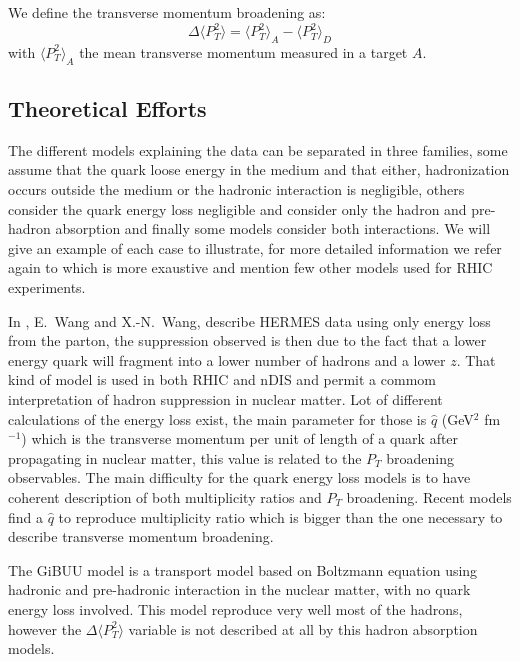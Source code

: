 We define the transverse momentum broadening as:
\begin{equation}
\Delta \langle P_T^2 \rangle = \langle P_T^2 \rangle_A - \langle P_T^2 \rangle_D
\end{equation}
with $\langle P_T^2 \rangle_A$ the mean transverse momentum measured in a target $A$.


\subsection{Theoretical Efforts}
\label{sec:theo}

The different models explaining the data can be separated in three families,
some assume that the quark loose energy in the medium and that either, hadronization occurs
outside the medium or the hadronic interaction is 
negligible, others consider the quark energy loss negligible and consider
only the hadron and pre-hadron absorption and finally some models consider both
interactions. We will give an example of each case to illustrate, for more
detailed information we refer again to \cite{Accardi:2009qv} which is more exaustive and
mention few other models used for RHIC experiments.

In \cite{Wang:2002ri}, E.~Wang and X.-N.~Wang, describe HERMES data using only energy 
loss from the parton, the suppression observed is then due to the fact that a 
lower energy quark will fragment into a lower number of hadrons and a lower 
$z$. That kind of model is used in both RHIC and nDIS and permit a commom 
interpretation of hadron suppression in nuclear matter. Lot of different
calculations of the energy loss exist, the main parameter for those is $\hat q$
(GeV$^2$ fm$^{-1}$) which is the transverse momentum per unit of length of a 
quark after propagating
in nuclear matter, this value is related to the $P_T$ 
broadening observables. The main difficulty for the quark energy loss
models is to have coherent description of both multiplicity ratios and $P_T$ 
broadening. Recent models find a $\hat q$ to reproduce multiplicity ratio
which is bigger than the one necessary to describe transverse momentum broadening.

The GiBUU model \cite{Gallmeister:2007an} is a transport model based on Boltzmann equation
using hadronic and pre-hadronic interaction in the nuclear matter, with no
quark energy loss involved. This model reproduce very well most of the hadrons, 
however the $\Delta \langle P_T^2 \rangle$ variable is not described at all by 
this hadron absorption models.

